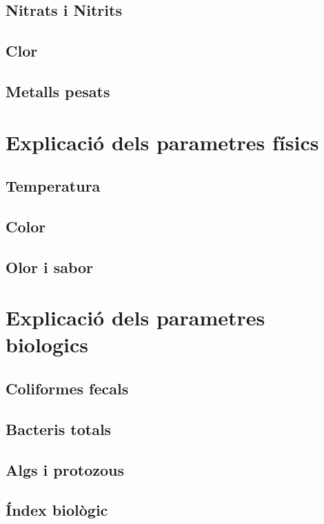 \subsection{Nitrats i Nitrits} \label{subsec:nitratsnitrits}

\subsection{Clor} \label{subsec:clor}

\subsection{Metalls pesats} \label{subsec:metallspesats}


\section{Explicació dels parametres físics}

\subsection{Temperatura} \label{subsec:temperatura}

\subsection{Color} \label{subsec:color}

\subsection{Olor i sabor} \label{subsec:olorisabor}

\section{Explicació dels parametres biologics}

\subsection{Coliformes fecals} \label{subsec:coliformes}

\subsection{Bacteris totals} \label{subsec:bacteris}

\subsection{Algs i protozous} \label{subsec:algsiprotozous}

\subsection{Índex biològic} \label{subsec:indexbiologic}


